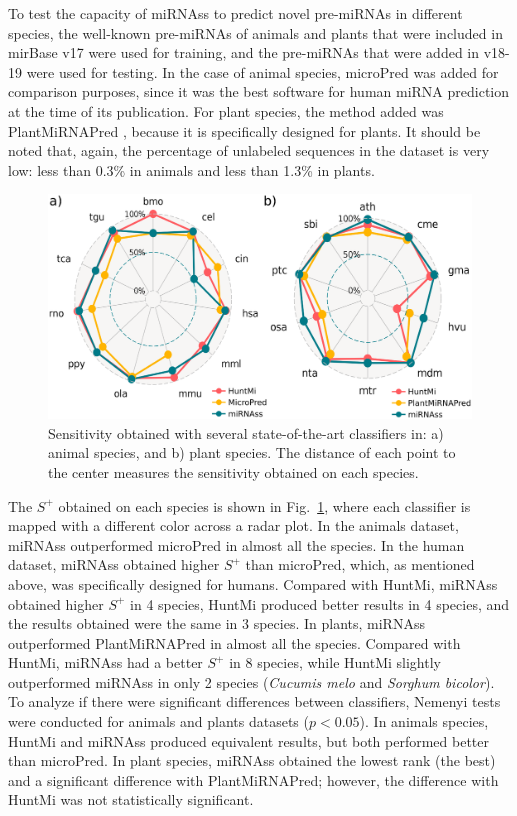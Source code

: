 \documentclass{article}
\begin{document}
To test the capacity of miRNAss to predict novel pre-miRNAs in different species, the well-known pre-miRNAs of animals and plants that were included in mirBase v17 were used for training, and the pre-miRNAs that were added in v18-19 were used for testing. In the case of animal species, microPred \citep{batuwita2009micropred} was added for comparison purposes, since it was the best software for human miRNA prediction at the time of its publication. For plant species, the method added was PlantMiRNAPred \citep{xuan2011plantmirnapred}, because it is specifically designed for plants. It should be noted that, again, the percentage of unlabeled sequences in the dataset is very low: less than 0.3\% in animals and less than 1.3\% in plants.
\begin{figure}[tpb]
	\centering
	\includegraphics[width=0.6\linewidth]{delta_mirbase_radar.eps}
	\caption{Sensitivity obtained with several state-of-the-art classifiers in: a) animal species, and b) plant species. The distance of each point to the center measures the sensitivity obtained on each species.}
	\label{fig:deltaRadar}
\end{figure}

The $S^{+}$ obtained on each species is shown in Fig.~\ref{fig:deltaRadar}, where each classifier is mapped with a different color across a radar plot. In the animals dataset, miRNAss outperformed microPred in almost all the species. In the human dataset, miRNAss obtained higher $S^{+}$ than microPred, which, as mentioned above, was specifically designed for humans. Compared with HuntMi, miRNAss obtained higher $S^{+}$ in 4 species, HuntMi produced better results in 4 species, and the results obtained were the same in 3 species. In plants, miRNAss outperformed PlantMiRNAPred in almost all the species. Compared with HuntMi, miRNAss had a better $S^{+}$ in 8 species, while HuntMi slightly outperformed miRNAss in only 2 species (\textit{Cucumis melo} and \textit{Sorghum bicolor}).
To analyze if there were significant differences between classifiers, Nemenyi tests \citep{nemenyi1962distribution} were conducted for animals and plants datasets ($p<0.05$). In animals species, HuntMi and miRNAss produced equivalent results, but both performed better than microPred. In plant species, miRNAss obtained the lowest rank (the best) and a significant difference with PlantMiRNAPred; however, the difference with HuntMi was not statistically significant.
\end{document}
